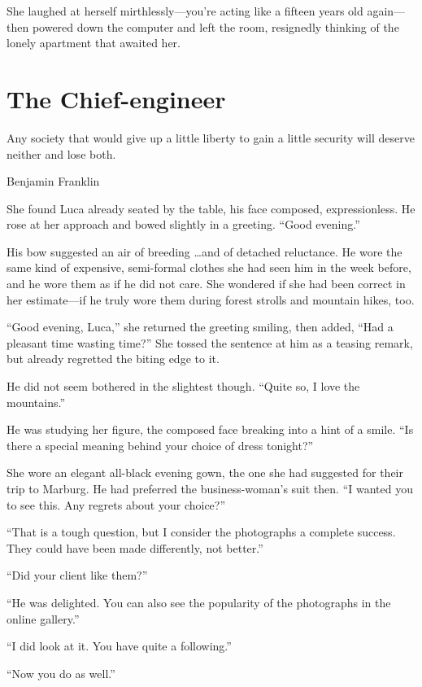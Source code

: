 She laughed at herself mirthlessly---you're acting like a fifteen years old again---then powered down the computer and left the room, resignedly thinking of the lonely apartment that awaited her.

\chapter{The Chief-engineer}

\epigraph{Any society that would give up a little liberty to gain a little security will deserve neither and lose both.}{Benjamin Franklin}

\firstparagraph

She found Luca already seated by the table, his face composed, expressionless. He rose at her approach and bowed slightly in a greeting. ``Good evening.''

His bow suggested an air of breeding \ldots and of detached reluctance. He wore the same kind of expensive, semi-formal clothes she had seen him in the week before, and he wore them as if he did not care. She wondered if she had been correct in her estimate---if he truly wore them during forest strolls and mountain hikes, too.

``Good evening, Luca,'' she returned the greeting smiling, then added, ``Had a pleasant time wasting time?'' She tossed the sentence at him as a teasing remark, but already regretted the biting edge to it.

He did not seem bothered in the slightest though. ``Quite so, I love the mountains.''

He was studying her figure, the composed face breaking into a hint of a smile. ``Is there a special meaning behind your choice of dress tonight?''

She wore an elegant all-black evening gown, the one she had suggested for their trip to Marburg. He had preferred the business-woman's suit then. ``I wanted you to see this. Any regrets about your choice?''

``That is a tough question, but I consider the photographs a complete success. They could have been made differently, not better.''

``Did your client like them?''

``He was delighted. You can also see the popularity of the photographs in the online gallery.''

``I did look at it. You have quite a following.''

``Now you do as well.''

